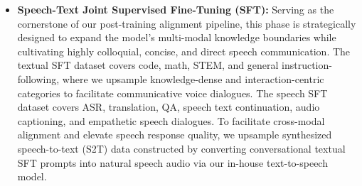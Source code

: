 \begin{itemize}
    \item \textbf{Speech-Text Joint Supervised Fine-Tuning (SFT):} Serving as the cornerstone of our post-training alignment pipeline, this phase is strategically designed to expand the model's multi-modal knowledge boundaries while cultivating highly colloquial, concise, and direct speech communication. The textual SFT dataset covers code, math, STEM, and general instruction-following, where we upsample knowledge-dense and interaction-centric categories to facilitate communicative voice dialogues. The speech SFT dataset covers ASR, translation, QA, speech text continuation, audio captioning, and empathetic speech dialogues. To facilitate cross-modal alignment and elevate speech response quality, we upsample synthesized speech-to-text (S2T) data constructed by converting conversational textual SFT prompts into natural speech audio via our in-house text-to-speech model.
    

\end{itemize}
